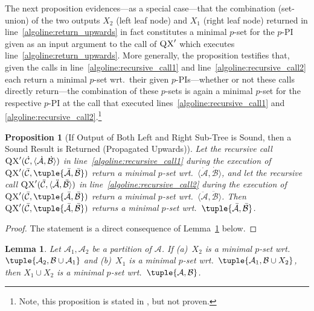 \documentclass[]{elsarticle}
\newcommand{\scQX}{{\textsc{QX}}}
\newcommand{\ma}{\mathcal{A}}
\newcommand{\mb}{\mathcal{B}}
\newcommand{\mc}{\mathcal{C}}
\newcommand{\ba}{\bar{\ma}}
\newcommand{\bb}{\bar{\mb}}
\newcommand{\bc}{\bar{\mc}}
\newcommand{\ddmb}{\ddot{\mb}}
\newcommand{\ddma}{\ddot{\ma}}
\newcommand{\ddmc}{\ddot{\mc}}
\newcommand{\dmb}{\dot{\mb}}
\newcommand{\dma}{\dot{\ma}}
\newcommand{\dmc}{\dot{\mc}}
\newtheorem{proposition}{Proposition}[]{}
\newtheorem{lemma}{Lemma}[]{}
\begin{document}
	The next proposition evidences---as a special case---that the combination (set-union) of the two outputs $X_2$ (left leaf node) and $X_1$ (right leaf node) returned in line~\ref{algoline:return_upwards} in fact constitutes a minimal $p$-set for the $p$-PI given as an input argument to the call of $\scQX'$ which executes line~\ref{algoline:return_upwards}. More generally, the proposition testifies that, given the calls in line~\ref{algoline:recursive_call1} and line~\ref{algoline:recursive_call2} each return a minimal $p$-set wrt.\ their given $p$-PIs---whether or not these calls directly return---the combination of these $p$-sets is again a minimal $p$-set for the respective $p$-PI at the call that executed lines~\ref{algoline:recursive_call1} and \ref{algoline:recursive_call2}.\footnote{Note, this proposition is stated in \cite{junker04}, but not proven.} 
	\begin{proposition}[If Output of Both Left and Right Sub-Tree is Sound, then a Sound Result is Returned (Propagated Upwards)]\label{prop:if_both_subtrees_sound_then_tree_is_sound}
		Let the recursive call $\scQX'(\dmc,\langle\dma,\dmb\rangle)$ in line~\ref{algoline:recursive_call1} during the execution of $\scQX'(\bc,\tuple{\ba,\bb})$ return 
		a minimal $p$-set wrt.\ $\langle\dma,\dmb\rangle$, and let the recursive call $\scQX'(\ddmc,\langle\ddma,\ddmb\rangle)$ in line~\ref{algoline:recursive_call2} during the execution of $\scQX'(\bc,\tuple{\ba,\bb})$ return 
		a minimal $p$-set wrt.\ $\langle\ddma,\ddmb\rangle$. Then $\scQX'(\bc,\tuple{\ba,\bb})$ returns a minimal $p$-set wrt.\  $\tuple{\ba,\bb}$.	
	\end{proposition}
	\begin{proof}
		The statement is a direct consequence of Lemma~\ref{lem:qx_recursion_principle} below.
	\end{proof}
	\begin{lemma}\label{lem:qx_recursion_principle}
		Let $\ma_1, \ma_2$ be a partition of $\ma$. If \emph{(a)}~$X_2$ is a minimal $p$-set wrt.\ $\tuple{\ma_2, \mb \cup \ma_1}$ and \emph{(b)}~$X_1$ is a minimal $p$-set wrt.\ $\tuple{\ma_1, \mb \cup X_2}$, then $X_1 \cup X_2$ is a minimal $p$-set wrt.\ $\tuple{\ma, \mb}$.
	\end{lemma}
\end{document}
